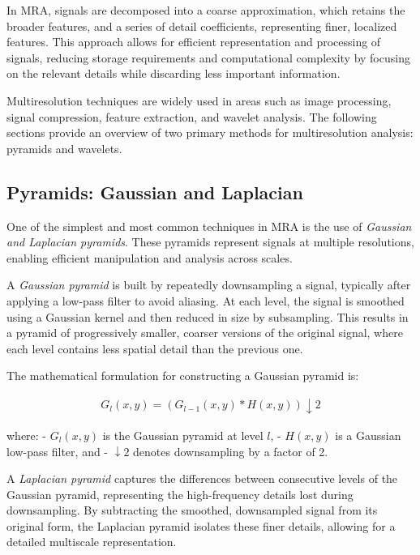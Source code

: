 In MRA, signals are decomposed into a coarse approximation, which retains the broader features, and a series of detail coefficients, representing finer, localized features. This approach allows for efficient representation and processing of signals, reducing storage requirements and computational complexity by focusing on the relevant details while discarding less important information.

Multiresolution techniques are widely used in areas such as image processing, signal compression, feature extraction, and wavelet analysis. The following sections provide an overview of two primary methods for multiresolution analysis: pyramids and wavelets.

\subsection{Pyramids: Gaussian and Laplacian}

One of the simplest and most common techniques in MRA is the use of \textit{Gaussian and Laplacian pyramids}. These pyramids represent signals at multiple resolutions, enabling efficient manipulation and analysis across scales.

A \textit{Gaussian pyramid} is built by repeatedly downsampling a signal, typically after applying a low-pass filter to avoid aliasing. At each level, the signal is smoothed using a Gaussian kernel and then reduced in size by subsampling. This results in a pyramid of progressively smaller, coarser versions of the original signal, where each level contains less spatial detail than the previous one.

The mathematical formulation for constructing a Gaussian pyramid is:

\begin{align}
  G_l(x, y) = (G_{l-1}(x, y) * H(x, y)) \downarrow 2
\end{align}

where:
- \( G_l(x, y) \) is the Gaussian pyramid at level \( l \),
- \( H(x, y) \) is a Gaussian low-pass filter, and
- \( \downarrow 2 \) denotes downsampling by a factor of 2.

A \textit{Laplacian pyramid} captures the differences between consecutive levels of the Gaussian pyramid, representing the high-frequency details lost during downsampling. By subtracting the smoothed, downsampled signal from its original form, the Laplacian pyramid isolates these finer details, allowing for a detailed multiscale representation.

